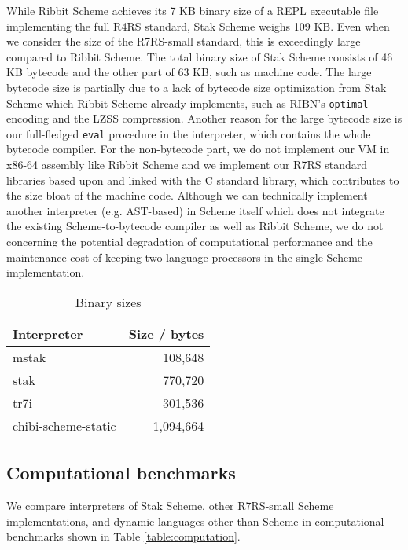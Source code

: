 \documentclass[sigplan]{acmart}
\begin{document}
While Ribbit Scheme \cite{ribbit7kb2023} achieves its 7 KB binary size
of a REPL executable file implementing the full R4RS standard, Stak
Scheme weighs 109 KB.
Even when we consider the size of the R7RS-small standard, this is
exceedingly large compared to Ribbit Scheme.
The total binary size of Stak Scheme consists of 46 KB bytecode and
the other part of 63 KB, such as machine code.
The large bytecode size is partially due to a lack of
bytecode size optimization from Stak Scheme which Ribbit Scheme already
implements, such as RIBN's \texttt{optimal} encoding and the
LZSS compression.
Another reason for the large bytecode size is our full-fledged
\texttt{eval} procedure in the interpreter, which contains the
whole bytecode compiler.
For the non-bytecode part, we do not implement our VM in x86-64
assembly like Ribbit Scheme and we implement our R7RS standard libraries
based upon and linked with the C standard library,
which contributes to the size bloat of the machine code.
Although we can technically implement another interpreter
(e.g. AST-based) in Scheme itself which does not integrate the
existing Scheme-to-bytecode compiler as well as Ribbit Scheme,
we do not concerning the potential degradation of
computational performance and the maintenance cost of keeping two
language processors in the single Scheme implementation.

\begin{table}
  \begin{center}
    \begin{tabular}{l|r}
      \hline
      Interpreter & Size / bytes \\
      \hline
      mstak & 108,648 \\
      stak & 770,720 \\
      tr7i & 301,536 \\
      chibi-scheme-static & 1,094,664 \\
      \hline
    \end{tabular}

    \caption{Binary sizes}
    \label{table:binary}
  \end{center}
\end{table}

\subsection{Computational benchmarks}

We compare interpreters of Stak Scheme, other R7RS-small Scheme
implementations, and
dynamic languages other than Scheme in computational
benchmarks shown in Table \ref{table:computation}.
\end{document}
